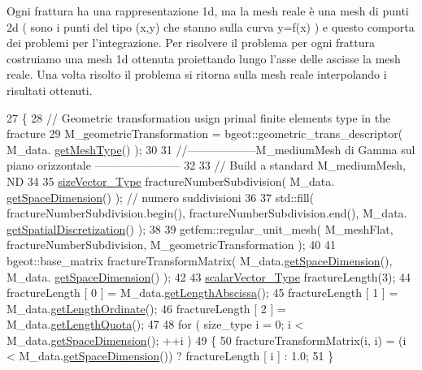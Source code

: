 Ogni frattura ha una rappresentazione 1d, ma la mesh reale è una mesh di punti 2d ( sono i punti del tipo (x,y) che stanno sulla curva y=f(x) ) e questo comporta dei problemi per l'integrazione. Per risolvere il problema per ogni frattura costruiamo una mesh 1d ottenuta proiettando lungo l'asse delle ascisse la mesh reale. Una volta risolto il problema si ritorna sulla mesh reale interpolando i risultati ottenuti. 
\begin{DoxyCode}
27 \{
28     \textcolor{comment}{// Geometric transformation usign primal finite elements type in the fracture}
29     M\_geometricTransformation = bgeot::geometric\_trans\_descriptor( M\_data.
      \hyperlink{classFractureData_aaded6c0452470489beb4ab95b5f4158f}{getMeshType}() );
30 
31     \textcolor{comment}{//------------------M\_mediumMesh di Gamma sul piano orizzontale -----------------------}
32 
33     \textcolor{comment}{// Build a standard M\_mediumMesh, ND}
34 
35     \hyperlink{Core_8h_a83c51913d041a5001e8683434c09857f}{sizeVector\_Type} fractureNumberSubdivision( M\_data.
      \hyperlink{classFractureData_a4ead03266295fe14fa3285692f945d89}{getSpaceDimension}() ); \textcolor{comment}{// numero suddivisioni}
36 
37     std::fill( fractureNumberSubdivision.begin(), fractureNumberSubdivision.end(), M\_data.
      \hyperlink{classFractureData_a5c10d579be7849be1a126c24982f8a23}{getSpatialDiscretization}() );
38 
39     getfem::regular\_unit\_mesh( M\_meshFlat, fractureNumberSubdivision, M\_geometricTransformation );
40 
41     bgeot::base\_matrix fractureTransformMatrix( M\_data.\hyperlink{classFractureData_a4ead03266295fe14fa3285692f945d89}{getSpaceDimension}(), M\_data.
      \hyperlink{classFractureData_a4ead03266295fe14fa3285692f945d89}{getSpaceDimension}() );
42 
43     \hyperlink{Core_8h_a4e75b5863535ba1dd79942de2846eff0}{scalarVector\_Type} fractureLength(3);
44     fractureLength [ 0 ] = M\_data.\hyperlink{classFractureData_abaebcf16d83713858e25837939ad3161}{getLengthAbscissa}();
45     fractureLength [ 1 ] = M\_data.\hyperlink{classFractureData_a905e953f685b1329ddcc7ee56f8302b1}{getLengthOrdinate}();
46     fractureLength [ 2 ] = M\_data.\hyperlink{classFractureData_a79747fff53da9d858950d83ad0114288}{getLengthQuota}();
47 
48     \textcolor{keywordflow}{for} ( size\_type i = 0; i < M\_data.\hyperlink{classFractureData_a4ead03266295fe14fa3285692f945d89}{getSpaceDimension}(); ++i )
49     \{
50         fractureTransformMatrix(i, i) = (i < M\_data.\hyperlink{classFractureData_a4ead03266295fe14fa3285692f945d89}{getSpaceDimension}()) ? fractureLength 
      [ i ] : 1.0;
51     \}

\end{DoxyCode}
